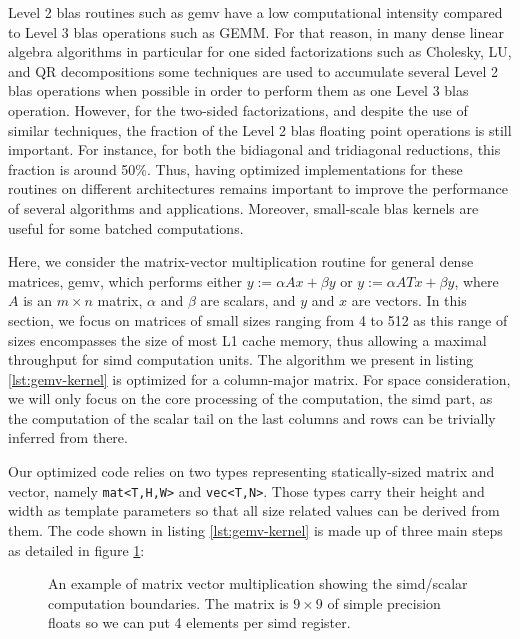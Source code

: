 \documentclass[../main]{subfiles}
\begin{document}
Level 2 \gls{blas} routines such as \gls{gemv} have a low
computational intensity compared to Level 3 \gls{blas} operations
such as GEMM. For that reason, in many dense linear algebra
algorithms in particular for one sided factorizations such as
Cholesky, LU, and QR decompositions some techniques are
used to accumulate several Level 2 \gls{blas} operations when
possible in order to perform them as one Level 3 \gls{blas}
operation\cite{hpcs18}. However, for the two-sided factorizations,
and despite the use of similar techniques, the fraction of the
Level 2 \gls{blas} floating point operations is still important. For
instance, for both the bidiagonal and tridiagonal reductions,
this fraction is around 50\%\cite{hpcs19}. Thus, having optimized
implementations for these routines on different architectures
remains important to improve the performance of several
algorithms and applications. Moreover, small-scale \gls{blas}
kernels are useful for some batched computations\cite{hpcs20}.

Here, we consider the matrix-vector multiplication routine
for general dense matrices, \gls{gemv}, which performs either
$y := \alpha A x + \beta y$ or $y := \alpha A T x + \beta y$,
where $A$ is an $m \times n$ matrix, $\alpha$ and $\beta$ are scalars,
and $y$ and $x$ are vectors. In this section,
we focus on matrices of small sizes ranging from
4 to 512 as this range of sizes encompasses the size of
most L1 cache memory, thus allowing a maximal throughput
for \gls{simd} computation units. The algorithm we present in
listing \ref{lst:gemv-kernel} is optimized for a column-major matrix.
For space consideration, we will only focus on the core processing of
the computation, \ie the \gls{simd} part, as the computation of
the scalar tail on the last columns and rows can be trivially
inferred from there.

Our optimized code relies on two types representing
statically-sized matrix and vector, namely \lstinline{mat<T,H,W>}
and \lstinline{vec<T,N>}. Those types carry their height and width
as template parameters so that all size related values can be
derived from them. The code shown in listing \ref{lst:gemv-kernel} is made up
of three main steps as detailed in figure \ref{fig:simd-gemv-illustration}:

\begin{figure}[h]
\fontsize{8}{10}\selectfont

\caption{
  An example of matrix vector multiplication showing the \gls{simd}/scalar
  computation boundaries. The matrix is $9 \times 9$ of simple precision floats
  so we can put 4 elements per \gls{simd} register.
}
\label{fig:simd-gemv-illustration}
\end{figure}
\end{document}
